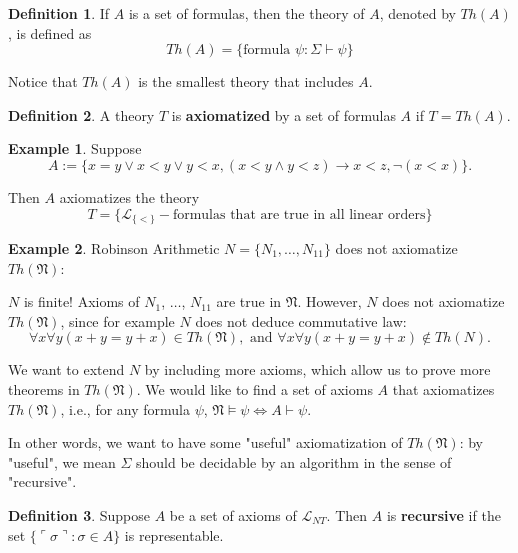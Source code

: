 \documentclass[11pt,letterpaper]{book}
\theoremstyle{definition}
\newtheorem{definition}{Definition}[section]
\newtheorem{example}{Example}[section]
\begin{document}
\begin{definition}
\label{def:theory_of_set_of_formula}
If $A$ is a set of formulas, then the theory of $A$, denoted by $Th(A)$, is defined as
$$ Th(A) = \{ \text{formula } \psi : \Sigma \vdash \psi \} $$
\end{definition}

Notice that $Th(A)$ is the smallest theory that includes $A$.

\begin{definition}
A theory $T$ is \textbf{axiomatized} by a set of formulas $A$ if $T = Th(A)$.
\label{def:theory_axiomatization}
\end{definition}

\begin{example}
Suppose
$$A := \{ x=y \lor x<y \lor y<x, (x<y\land y< z) \rightarrow x < z, \lnot ( x < x ) \}.  $$

Then $A$ axiomatizes the theory
$$ T = \{ \mathcal{L}_{ \{ < \} } - \text{formulas that are true in all linear orders} \} $$

\end{example}

\begin{example}
Robinson Arithmetic $N = \{ N_1, \ldots, N_{11} \}$ does not axiomatize $Th(\mathfrak{N})$:

$N$ is finite! Axioms of $N_1$, $\ldots$, $N_{11}$ are true in $\mathfrak{N}$. However, $N$ does not axiomatize $Th(\mathfrak{N})$, since for example $N$ does not deduce commutative law:
$$ \forall x \forall y ( x+ y = y +x  ) \in Th(\mathfrak{N}), \text{ and }  \forall x \forall y ( x+ y = y +x  ) \not \in Th(N) . $$

\end{example}


We want to extend $N$ by including more axioms, which allow us to prove more theorems in $Th(\mathfrak{N})$. We would like to find a set of axioms $A$ that axiomatizes $Th(\mathfrak{N})$, i.e., for any formula $\psi$, $ \mathfrak{N} \models \psi \iff A \vdash \psi $. 

In other words, we want to have some "useful" axiomatization of $Th(\mathfrak{N})$: by "useful", we mean $\Sigma$ should be decidable by an algorithm in the sense of "recursive".

\begin{definition}
Suppose $A$ be a set of axioms of $\mathcal{L}_{NT}$. Then $A$ is \textbf{recursive} if the set $ \{ \ulcorner \sigma \urcorner : \sigma \in A \}$ is representable.
\end{definition}
\end{document}
